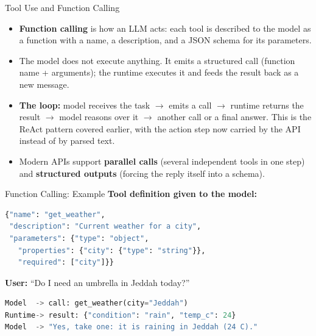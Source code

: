 \begin{frame}{Tool Use and Function Calling}
  \begin{itemize}
    \item[\textcolor{red}{$\triangleright$}] \textbf{Function calling} is how an LLM acts: each tool is described to the model as a function with a name, a description, and a JSON schema for its parameters.
    \item[\textcolor{red}{$\triangleright$}] The model does not execute anything. It emits a structured call (function name + arguments); the runtime executes it and feeds the result back as a new message.
    \item[\textcolor{red}{$\triangleright$}] \textbf{The loop:} model receives the task $\rightarrow$ emits a call $\rightarrow$ runtime returns the result $\rightarrow$ model reasons over it $\rightarrow$ another call or a final answer. This is the ReAct pattern covered earlier, with the action step now carried by the API instead of by parsed text.
    \item[\textcolor{red}{$\triangleright$}] Modern APIs support \textbf{parallel calls} (several independent tools in one step) and \textbf{structured outputs} (forcing the reply itself into a schema).
  \end{itemize}
\end{frame}

\begin{frame}[fragile]{Function Calling: Example}
  \textbf{Tool definition given to the model:}
  \begin{lstlisting}[language=Python, showstringspaces=false]
{"name": "get_weather",
 "description": "Current weather for a city",
 "parameters": {"type": "object",
   "properties": {"city": {"type": "string"}},
   "required": ["city"]}}
  \end{lstlisting}
  \textbf{User:} ``Do I need an umbrella in Jeddah today?''
  \begin{lstlisting}[language=Python, showstringspaces=false]
Model  -> call: get_weather(city="Jeddah")
Runtime-> result: {"condition": "rain", "temp_c": 24}
Model  -> "Yes, take one: it is raining in Jeddah (24 C)."
  \end{lstlisting}
\end{frame}

